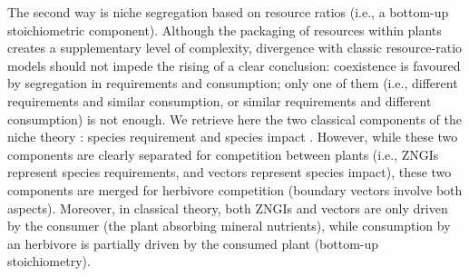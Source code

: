 \documentclass[12pt]{article}
\begin{document}
\par
The second way is niche segregation based on resource ratios (i.e., a bottom-up stoichiometric component). Although the packaging of resources within plants creates a supplementary level of complexity, divergence with classic resource-ratio models should not impede the rising of a clear conclusion: coexistence is favoured by segregation in requirements and consumption; only one of them (i.e., different requirements and similar consumption, or similar requirements and different consumption) is not enough. We retrieve here the two classical components of the niche theory \citep{Chase2003}: species requirement \citep{Hutchinson1957} and species impact \citep{Elton1927, Macarthur1967}. However, while these two components are clearly separated for competition between plants (i.e., ZNGIs represent species requirements, and vectors represent species impact), these two components are merged for herbivore competition (boundary vectors involve both aspects). Moreover, in classical theory, both ZNGIs and vectors are only driven by the consumer (the plant absorbing mineral nutrients), while consumption by an herbivore is partially driven by the consumed plant (bottom-up stoichiometry). 
\par 
\end{document}
